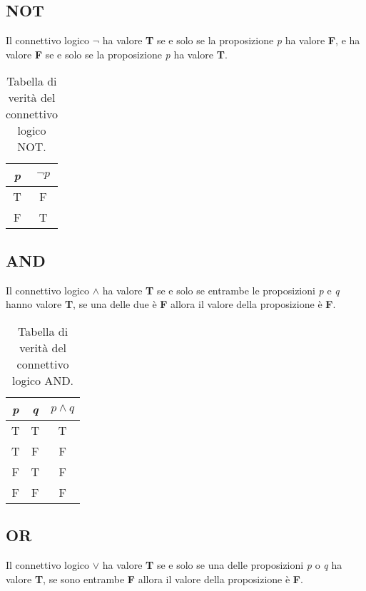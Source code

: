 \subsection{NOT}
Il connettivo logico $\neg$ ha valore \textbf{T} se e solo se la proposizione \textit{p} ha valore \textbf{F}, e ha valore \textbf{F} se e solo se la proposizione \textit{p} ha valore \textbf{T}.

\begin{table}[H]
    \centering
    \caption{\label{tab:true_table_NOT}Tabella di verità del connettivo logico NOT.}
    \begin{tabular}{|c || c ||} 
     \hline
     \textit{p} & $\neg p$ \\
     \hline\hline
     T & F \\ 
     \hline
     F & T \\
     \hline
    \end{tabular}
\end{table}

\subsection{AND}
Il connettivo logico \textbf{$\wedge$} ha valore \textbf{T} se e solo se entrambe le proposizioni \textit{p} e \textit{q} hanno valore \textbf{T}, se una delle due è \textbf{F} allora il valore della proposizione è \textbf{F}.

\begin{table}[H]
    \centering
    \caption{\label{tab:true_table_AND}Tabella di verità del connettivo logico AND.}
    \begin{tabular}{|c | c || c ||} 
     \hline
     \textit{p} & \textit{q} & $p \wedge q$ \\
     \hline\hline
     T & T & T \\ 
     \hline
     T & F & F \\
     \hline
     F & T & F \\
     \hline
     F & F & F \\
     \hline
    \end{tabular}
\end{table}

\subsection{OR}
Il connettivo logico \textbf{$\vee$} ha valore \textbf{T} se e solo se una delle proposizioni \textit{p} o \textit{q} ha valore \textbf{T}, se sono entrambe \textbf{F} allora il valore della proposizione è \textbf{F}.

